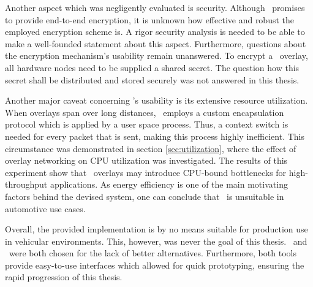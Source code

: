 Another aspect which was negligently evaluated is security. Although \wnet\ promises to provide end-to-end encryption, it is unknown how effective and robust the employed encryption scheme is. A rigor security analysis is needed to be able to make a well-founded statement about this aspect. Furthermore, questions about the encryption mechanism's usability remain unanswered. To encrypt a \weave\ overlay, all hardware nodes need to be supplied a shared secret. The question how this secret shall be distributed and stored securely was not answered in this thesis.

Another major caveat concerning \weave 's usability is its extensive resource utilization.  When overlays span over long distances, \weave\ employs a custom encapsulation protocol which is applied by a user space process. Thus, a context switch is needed for every packet that is sent, making this process highly inefficient. This circumstance was demonstrated in section \ref{sec:utilization}, where the effect of overlay networking on CPU utilization was investigated. The results of this experiment show that \weave\ overlays may introduce CPU-bound bottlenecks for high-throughput applications. As energy efficiency is one of the main motivating factors behind the devised system, one can conclude that \wnet\ is unsuitable in automotive use cases.

Overall, the provided implementation is by no means suitable for production use in vehicular environments. This, however, was never the goal of this thesis. \wnet\ and \docker\ were both chosen for the lack of better alternatives. Furthermore, both tools provide easy-to-use interfaces which allowed for quick prototyping, ensuring the rapid progression of this thesis. 

